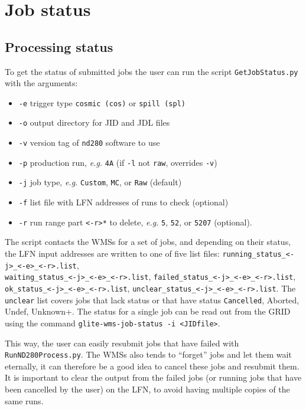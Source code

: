 \documentclass[11pt]{article}
\begin{document}
\clearpage
\section{Job status}
\label{sec:status}

\subsection{Processing status}
To get the status of submitted jobs the user can run the script \verb+GetJobStatus.py+ with the arguments:
\begin{itemize}
\item \verb+-e+ trigger type \verb+cosmic (cos)+ or \verb+spill (spl)+
\item \verb+-o+ output directory for JID and JDL files
\item \verb+-v+ version tag of \verb+nd280+ software to use
\item \verb+-p+ production run, \textit{e.g.} \verb+4A+ (if \verb+-l+ not \verb+raw+, overrides \verb+-v+)
\item \verb+-j+ job type, \textit{e.g.} \verb+Custom+, \verb+MC+, or \verb+Raw+ (default)
\item \verb+-f+ list file with LFN addresses of runs to check (optional)
\item \verb+-r+ run range part \verb+<-r>*+ to delete, \textit{e.g.} \verb+5+, \verb+52+, or \verb+5207+ (optional).
\end{itemize}
The script contacts the WMSs for a set of jobs, and depending on their
status, the LFN input addresses are written to one of five list files:
\verb+running_status_<-j>_<-e>_<-r>.list+,\\
\verb+waiting_status_<-j>_<-e>_<-r>.list+,
\verb+failed_status_<-j>_<-e>_<-r>.list+,\\
\verb+ok_status_<-j>_<-e>_<-r>.list+,
\verb+unclear_status_<-j>_<-e>_<-r>.list+. The \verb+unclear+ list
covers jobs that lack status or that have status \verb+Cancelled+,
Aborted, Undef, Unknown+. The status for a single job can be read out
from the GRID using the command \verb+glite-wms-job-status -i <JIDfile>+.

This way, the user can easily resubmit jobs that have failed with
\verb+RunND280Process.py+. The WMSs also tends to ``forget'' jobs and
let them wait eternally, it can therefore be a good idea to cancel
these jobs and resubmit them. It is important to clear the output from
the failed jobs (or running jobs that have been cancelled by the user)
on the LFN, to avoid having multiple copies of the same runs.
\end{document}
